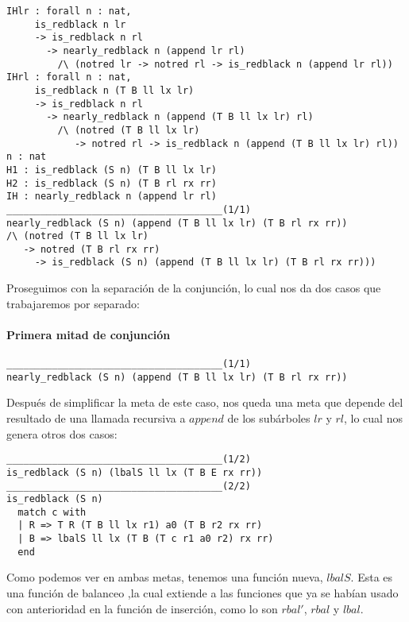 \begin{verbatim}
IHlr : forall n : nat,
     is_redblack n lr
     -> is_redblack n rl
       -> nearly_redblack n (append lr rl)
         /\ (notred lr -> notred rl -> is_redblack n (append lr rl))
IHrl : forall n : nat,
     is_redblack n (T B ll lx lr)
     -> is_redblack n rl
       -> nearly_redblack n (append (T B ll lx lr) rl)
         /\ (notred (T B ll lx lr)
            -> notred rl -> is_redblack n (append (T B ll lx lr) rl))
n : nat
H1 : is_redblack (S n) (T B ll lx lr)
H2 : is_redblack (S n) (T B rl rx rr)
IH : nearly_redblack n (append lr rl)
______________________________________(1/1)
nearly_redblack (S n) (append (T B ll lx lr) (T B rl rx rr))
/\ (notred (T B ll lx lr)
   -> notred (T B rl rx rr)
     -> is_redblack (S n) (append (T B ll lx lr) (T B rl rx rr)))
\end{verbatim}

Proseguimos con la separaci\'on de la conjunci\'on, lo cual nos da dos casos que trabajaremos por
separado:

\paragraph{Primera mitad de conjunci\'on}

\begin{verbatim}
______________________________________(1/1)
nearly_redblack (S n) (append (T B ll lx lr) (T B rl rx rr))
\end{verbatim}

Después de simplificar la meta de este caso, nos queda una meta que depende del resultado de una
llamada recursiva a \hyperref[func_app]{$append$} de los subárboles $lr$ y $rl$, lo cual nos genera 
otros dos casos:

\begin{verbatim}
______________________________________(1/2)
is_redblack (S n) (lbalS ll lx (T B E rx rr))
______________________________________(2/2)
is_redblack (S n)
  match c with
  | R => T R (T B ll lx r1) a0 (T B r2 rx rr)
  | B => lbalS ll lx (T B (T c r1 a0 r2) rx rr)
  end
\end{verbatim}

Como podemos ver en ambas metas, tenemos una funci\'on nueva, \hyperref[lbalS]{$lbalS$}. Esta es una 
funci\'on de balanceo ,la cual extiende a las funciones que ya se habían usado con anterioridad en la 
funci\'on de inserci\'on, como lo son \hyperref[rbal_2]{$rbal'$}, \hyperref[func_balanceo]{$rbal$} y 
\hyperref[func_balanceo]{$lbal$}.

